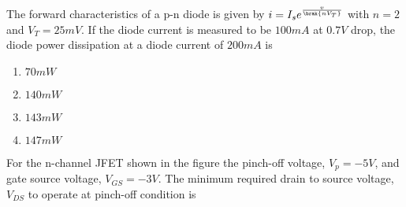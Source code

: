     \item The forward characteristics of a p-n diode is given by $i=I_{s}e^{\frac{v}{\brak{nV_{T}}}}$ with $n=2$ and $V_{T}=25mV$. If the diode current is measured to be $100mA$ at $0.7V$ drop, the diode power dissipation at a diode current of $200mA$ is 
        \begin{enumerate}
            \item $70mW$
            \item $140mW$
            \item $143mW$
            \item $147mW$
        \end{enumerate}

    \item For the n-channel JFET shown in the figure the pinch-off voltage, $V_{p}=-5V$, and gate source voltage, $V_{GS}=-3V$. The minimum required drain to source voltage, $V_{DS}$ to operate at pinch-off condition is
